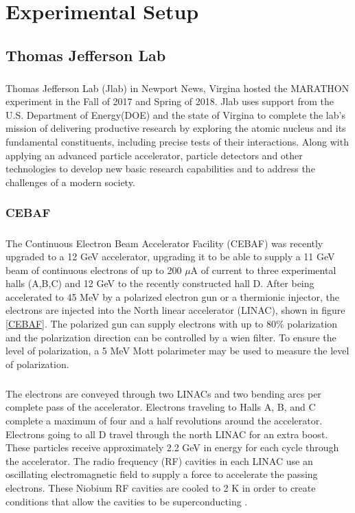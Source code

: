 


\chapter{ Experimental Setup}

\section{Thomas Jefferson Lab}
\paragraph{}Thomas Jefferson Lab (Jlab) in Newport News, Virgina hosted the MARATHON experiment in the Fall of 2017 and Spring of 2018. Jlab uses support from the U.S. Department of Energy(DOE) and the state of Virgina to complete the lab's mission of delivering productive research by exploring the atomic nucleus and its fundamental constituents, including precise tests of their interactions. Along with applying an advanced particle accelerator, particle detectors and other technologies to develop new basic research capabilities and to address the challenges of a modern society.
	\subsection{CEBAF}
	\paragraph{}The Continuous Electron Beam Accelerator Facility (CEBAF) was recently upgraded to a 12 GeV accelerator, upgrading it to be able to supply a 11 GeV beam of continuous electrons of up to 200 $\mu$A of current to three experimental halls (A,B,C) and 12 GeV to the recently constructed hall D. After being accelerated to 45 MeV by a polarized electron gun or a thermionic injector, the electrons are injected into the North linear accelerator (LINAC), shown in figure \ref{CEBAF}. The polarized gun can supply electrons with up to 80$\%$ polarization and the polarization direction can be controlled by a wien filter. To ensure the level of polarization, a 5 MeV Mott polarimeter may be used to measure the level of polarization\cite{HallA}.
	\paragraph{} The electrons are conveyed through two LINACs and two bending arcs per complete pass of the accelerator. Electrons traveling to Halls A, B, and C complete a maximum of four and a half revolutions around the accelerator. Electrons going to all D travel through the north LINAC for an extra boost. These particles receive approximately 2.2 GeV in energy for each cycle through the accelerator. The radio frequency (RF) cavities in each LINAC use an oscillating electromagnetic field to supply a force to accelerate the passing electrons. These Niobium RF cavities are cooled to 2 K in order to create conditions that allow the cavities to be superconducting \cite{HallA}.    
	
